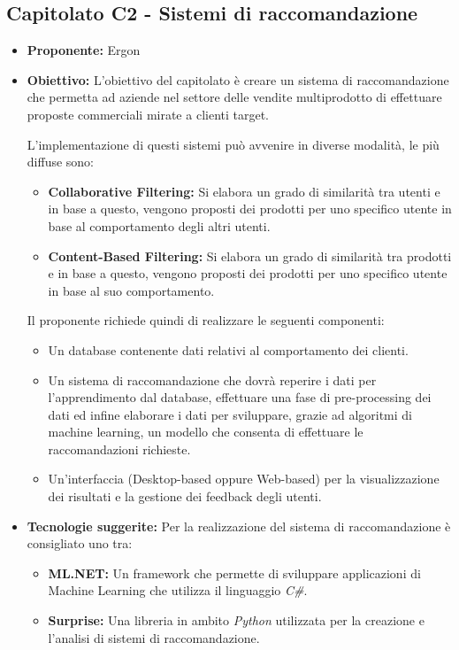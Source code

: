 \documentclass{article}
\begin{document}

\subsection{\textbf{Capitolato C2} - Sistemi di raccomandazione}
\begin{itemize}
    \item[] \textbf{Proponente:} Ergon
    
    \item[] \textbf{Obiettivo:} L’obiettivo del capitolato è creare un sistema di raccomandazione che permetta ad aziende nel settore delle vendite multiprodotto di effettuare proposte commerciali mirate a clienti target.

    L’implementazione di questi sistemi può avvenire in diverse modalità, le più diffuse sono:
    \begin{itemize}
        \item \textbf{Collaborative Filtering:} Si elabora un grado di similarità tra utenti e in base a questo, vengono proposti dei prodotti per uno specifico utente in base al comportamento degli altri utenti.
        \item \textbf{Content-Based Filtering:} Si elabora un grado di similarità tra prodotti e in base a questo, vengono proposti dei prodotti per uno specifico utente in base al suo comportamento.
    \end{itemize}
    Il proponente richiede quindi di realizzare le seguenti componenti:
    \begin{itemize}
        \item Un database contenente dati relativi al comportamento dei clienti.
        \item Un sistema di raccomandazione che dovrà reperire i dati per l’apprendimento dal database, effettuare una fase di pre-processing dei dati ed infine elaborare i dati per sviluppare, grazie ad algoritmi di machine learning, un modello che consenta di effettuare le raccomandazioni richieste.
        \item Un’interfaccia (Desktop-based oppure Web-based) per la visualizzazione dei risultati e la gestione dei feedback degli utenti.
    \end{itemize}
    
    \item[] \textbf{Tecnologie suggerite:} Per la realizzazione del sistema di raccomandazione è consigliato uno tra:
    \begin{itemize}
        \item \textbf{ML.NET:} Un framework che permette di sviluppare applicazioni di Machine Learning che utilizza il linguaggio \textit{C\#}.
        \item \textbf{Surprise:} Una libreria in ambito \textit{Python} utilizzata per la creazione e l’analisi di sistemi di raccomandazione.
    \end{itemize}


\end{itemize}
\end{document}
